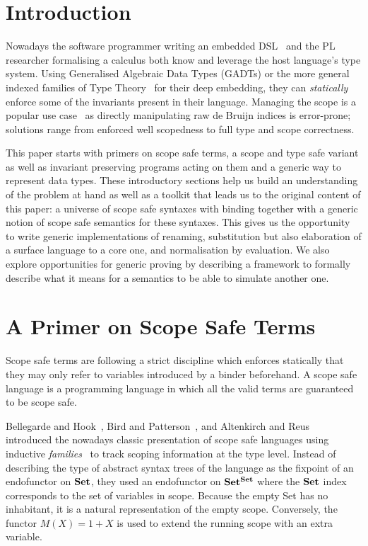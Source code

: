 
\section{Introduction}

Nowadays the software programmer writing an embedded DSL~\cite{hudak1996building}
and the PL researcher formalising a calculus both know and
leverage the host language's type system. Using Generalised
Algebraic Data Types (GADTs) or the more general indexed
families of Type Theory~\cite{dybjer1994inductive} for their deep embedding, they can
\emph{statically} enforce some of the invariants present in
their language. Managing the scope is a popular use case~\cite{altenkirch1999monadic} as
directly manipulating raw de Bruijn indices is error-prone;
solutions range from enforced well scopedness to full type
and scope correctness.

This paper starts with primers on scope safe terms, a scope and type
safe variant as well as invariant preserving programs acting on them
and a generic way to represent data types. These introductory sections
help us build an understanding of the problem at hand as well as a
toolkit that leads us to the original content of this paper: a universe
of scope safe syntaxes with binding together with a generic notion of
scope safe semantics for these syntaxes.
This gives us the opportunity to write generic implementations of renaming,
substitution but also elaboration of a surface language to a core one,
and normalisation by evaluation. We also explore opportunities for
generic proving by describing a framework to formally describe what
it means for a semantics to be able to simulate another one.




\section{A Primer on Scope Safe Terms}\label{section:primer-term}

Scope safe terms are following a strict discipline which enforces statically
that they may only refer to variables introduced by a binder beforehand. A
scope safe language is a programming language in which all the valid terms
are guaranteed to be scope safe.

Bellegarde and Hook~\citeyear{BELLEGARDE1994287}, Bird and Patterson~\citeyear{bird_paterson_1999},
and Altenkirch and Reus~\citeyear{altenkirch1999monadic} introduced the
nowadays classic presentation of scope safe languages using inductive
\emph{families}~\cite{dybjer1994inductive} to track scoping information
at the type level. Instead of describing the type of abstract syntax trees
of the language as the fixpoint of an endofunctor on $\mathbf{Set}{}$, they used
an endofunctor on $\mathbf{Set}{}^{\mathbf{Set}{}}$ where the $\mathbf{Set}{}$ index corresponds
to the set of variables in scope. Because the empty Set has no inhabitant,
it is a natural representation of the empty scope. Conversely, the functor
$M(X) = 1 + X$ is used to extend the running scope with an extra variable.

